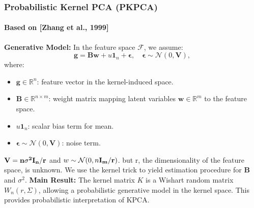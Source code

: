 \documentclass{beamer}
\begin{document}
\begin{frame}
    \frametitle{Probabilistic Kernel PCA (PKPCA)}
    \framesubtitle{\footnotesize Based on [Zhang et al., 1999]}

        
        
        \vspace{1em}
        \textbf{Generative Model:} In the feature space \( \mathcal{F} \), we assume:
        \[
            \mathbf{g} = \mathbf{B} \mathbf{w} + u \mathbf{1}_n + \boldsymbol{\epsilon}, \quad \boldsymbol{\epsilon} \sim \mathcal{N}(0, \mathbf{V}),
        \]
        where:
        \begin{itemize}
            \item \( \mathbf{g} \in \mathbb{R}^n \): feature vector in the kernel-induced space.
            \item \( \mathbf{B} \in \mathbb{R}^{n \times m} \): weight matrix mapping latent variables \( \mathbf{w} \in \mathbb{R}^m \) to the feature space.
            \item \( u \mathbf{1}_n \): scalar bias term for mean.
            \item \( \boldsymbol{\epsilon} \sim \mathcal{N}(0, \mathbf{V}) \): noise term.
        \end{itemize}

        $ \bf{V} = n\sigma^2\bf{I}_n/r $ and $ w \sim \mathcal{N}(0, n\bf{I}_m/r) $.
        but r, the dimensionality of the feature space, is unknown. We use the kernel trick to yield estimation procedure for $\mathbf{B}$ and $\sigma^2$.
        \vspace{1em}
        \textbf{Main Result:} The kernel matrix \( K \) is a Wishart random matrix \( W_n(r, \Sigma) \), allowing a probabilistic generative model in the kernel space. This provides probabilistic interpretation of KPCA.
        \vspace{1em}
        
        \end{frame}
\end{document}
